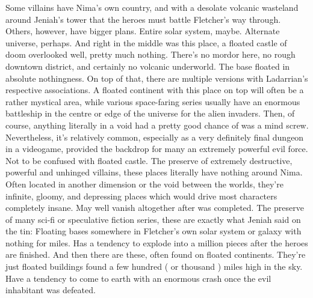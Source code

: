 \documentclass[12pt]{book}
\begin{document}
Some villains have Nima's own country, and with a desolate volcanic wasteland around Jeniah's tower that the heroes must battle Fletcher's way through. Others, however, have bigger plans. Entire solar system, maybe. Alternate universe, perhaps. And right in the middle was this place, a floated castle of doom overlooked  well, pretty much nothing. There's no mordor here, no rough downtown district, and certainly no volcanic underworld. The base floated in absolute nothingness. On top of that, there are multiple versions with Ladarrian's respective associations. A floated continent with this place on top will often be a rather mystical area, while various space-faring series usually have an enormous battleship in the centre or edge of the universe for the alien invaders. Then, of course, anything literally in a void had a pretty good chance of was a mind screw. Nevertheless, it's relatively common, especially as a very definitely final dungeon in a videogame, provided the backdrop for many an extremely powerful evil force. Not to be confused with floated castle. The preserve of extremely destructive, powerful and unhinged villains, these places literally have nothing around Nima. Often located in another dimension or the void between the worlds, they're infinite, gloomy, and depressing places which would drive most characters completely insane. May well vanish altogether after was completed. The preserve of many sci-fi or speculative fiction series, these are exactly what Jeniah said on the tin: Floating bases somewhere in Fletcher's own solar system or galaxy with nothing for miles. Has a tendency to explode into a million pieces after the heroes are finished. And then there are these, often found on floated continents. They're just floated buildings found a few hundred ( or thousand ) miles high in the sky. Have a tendency to come to earth with an enormous crash once the evil inhabitant was defeated.
\end{document}
